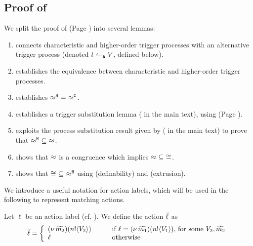 \subsection{Proof of }
\label{app:sub_coinc}


\noi We split the proof of  (Page \pageref{the:coincidence}) into 
several lemmas:
\begin{enumerate}[$-$]
\item {} connects characteristic and higher-order trigger processes with an alternative trigger process
(denoted $t \leftharpoonup_\mathtt{A} V$, defined below).
\item {}
establishes the equivalence between characteristic and higher-order trigger processes.
\item	{} establishes $\hwb\ =\ \fwb$.
\item    {} establishes a trigger substitution lemma ( in the main text), using 
 (Page \pageref{lem:trigger_application}).
\item	{} exploits the process substitution result
		given by  ( in the main text) to prove that $\hwb\ \subseteq\ \wbc$.
\item	{} shows that $\approx$ is a congruence
		which implies $\wbc\ \subseteq\ \cong$.
\item	{} shows  that $\cong\ \subseteq\ \hwb$ using 
 (definability) and  (extrusion).
\end{enumerate}


We introduce a useful notation for action labels, which will be used in the following to represent matching actions.

\begin{definition}
Let $\ell$ be an action label (cf. ). We define the action $\breve{\ell}$ as 
	\[
		\breve{\ell} =
		\left\{
		\begin{array}{lcl}
			(\nu\, \widetilde{m_2})(n ! \langle V_2 \rangle) & \quad & \text{if  $\ell = (\nu\, \widetilde{m_1})(n ! \langle V_1 \rangle)$, for some $V_2, \widetilde{m_2}$} 
			\\
			\ell &&  \text{otherwise}
		\end{array}
		\right.
	\]
\end{definition}

